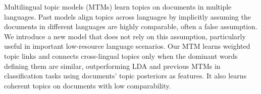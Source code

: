 Multilingual topic models (MTMs) learn topics on documents in multiple languages. Past models align topics across languages by implicitly assuming the documents in different languages are highly comparable, often a false assumption. We introduce a new model that does not rely on this assumption, particularly useful in important low-resource language scenarios. Our MTM learns weighted topic links and connects cross-lingual topics only when the dominant words defining them are similar, outperforming LDA and previous MTMs in classification tasks using documents' topic posteriors as features. It also learns coherent topics on documents with low comparability.